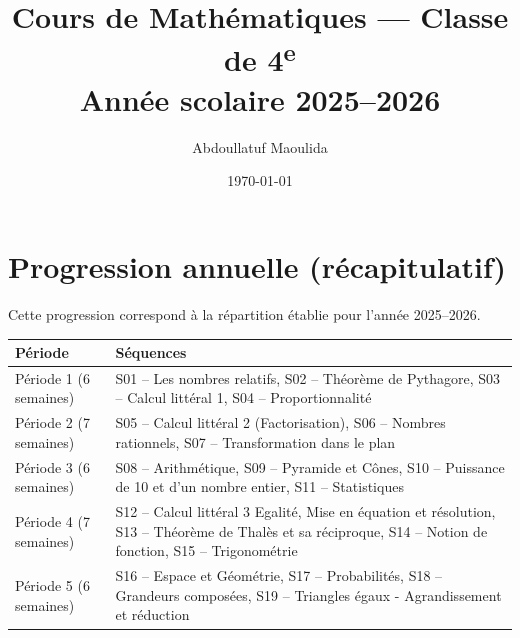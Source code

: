 \documentclass[12pt,a4paper]{book}
\title{Cours de Mathématiques — Classe de 4\textsuperscript{e}\\[0.4em]\large Année scolaire 2025–2026}
\author{Abdoullatuf Maoulida}
\date{\today}
\begin{document}
\maketitle
\tableofcontents
\cleardoublepage



\cleardoublepage
\appendix
\chapter{Progression annuelle (récapitulatif)}
Cette progression correspond à la répartition établie pour l'année 2025–2026.

\begin{center}
	\begin{tabular}{|p{2cm}|p{12cm}|}
		\hline
		\textbf{Période} & \textbf{Séquences} \\ \hline
		Période 1 (6 semaines) & S01 -- Les nombres relatifs, S02 -- Théorème de Pythagore, S03 -- Calcul littéral 1, S04 -- Proportionnalité \\ \hline
		Période 2 (7 semaines) & S05 -- Calcul littéral 2 (Factorisation), S06 -- Nombres rationnels, S07 -- Transformation dans le plan \\ \hline
		Période 3 (6 semaines) & S08 -- Arithmétique, S09 -- Pyramide et Cônes, S10 -- Puissance de 10 et d'un nombre entier, S11 -- Statistiques \\ \hline
		Période 4 (7 semaines) & S12 -- Calcul littéral 3 Egalité, Mise en équation et résolution, S13 -- Théorème de Thalès et sa réciproque, S14 -- Notion de fonction, S15 -- Trigonométrie \\ \hline
		Période 5 (6 semaines) & S16 -- Espace et Géométrie, S17 -- Probabilités, S18 -- Grandeurs composées, S19 -- Triangles égaux - Agrandissement et réduction \\ \hline
	\end{tabular}
\end{center}
\end{document}
